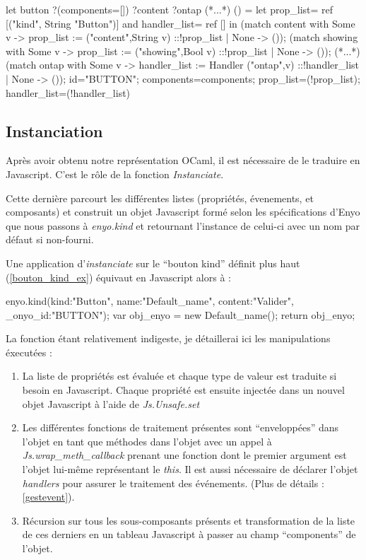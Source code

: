 \documentclass[11pt,a4paper]{report}
\begin{document}
\begin{OCaml}
  let button
      ?(components=[])
      ?content
      ?ontap
      (*...*)
      () =
    let prop_list= ref [("kind", String "Button")]
    and handler_list= ref [] in
    (match content with 
        Some v -> prop_list := ("content",String v)
                               ::!prop_list 
        | None -> ());
    (match showing with 
        Some v -> prop_list := ("showing",Bool v)
                               ::!prop_list 
        | None -> ());
    (*...*)
    (match ontap with 
        Some v -> handler_list := Handler ("ontap",v)
                                  ::!handler_list 
        | None -> ());
    {id="BUTTON"; 
     components=components;
     prop_list=(!prop_list);
     handler_list=(!handler_list)}
\end{OCaml}

\subsection{Instanciation}

Après avoir obtenu notre représentation OCaml, il est nécessaire de le traduire en Javascript.
C'est le rôle de la fonction \emph{Instanciate}.

Cette dernière parcourt les différentes listes (propriétés, évenements, et composants) et construit
un objet Javascript formé selon les spécifications d'Enyo que nous passons à \emph{enyo.kind} et 
retournant l'instance de celui-ci avec un nom par défaut si non-fourni.

Une application d'\emph{instanciate} sur le ``bouton kind'' définit plus haut (\ref{bouton_kind_ex}) 
équivaut en Javascript alors à :

\begin{JavaScript}
  enyo.kind({kind:"Button", name:"Default_name", content:"Valider", _onyo_id:"BUTTON"});
  var obj_enyo = new Default_name();
  return obj_enyo;
\end{JavaScript}

La fonction étant relativement indigeste, je détaillerai ici les manipulations éxecutées :

\begin{enumerate}
\item La liste de propriétés est évaluée et chaque type de valeur est traduite si besoin en Javascript.
  Chaque propriété est ensuite injectée dans un nouvel objet Javascript à l'aide de \emph{Js.Unsafe.set}
\item \label{wrap_meth} 
  Les différentes fonctions de traitement présentes sont ``enveloppées'' dans l'objet en tant que méthodes
  dans l'objet avec un appel à \\\emph{Js.wrap\_meth\_callback} prenant une fonction dont le premier argument
  est l'objet lui-même représentant le \emph{this}. Il est aussi nécessaire de déclarer l'objet
  \emph{handlers} pour assurer le traitement des événements.
  (Plus de détails : \ref{gestevent}).
\item Récursion sur tous les sous-composants présents et transformation de la liste de ces derniers en 
  un tableau Javascript à passer au champ ``components'' de l'objet.
\end{enumerate}
\end{document}
